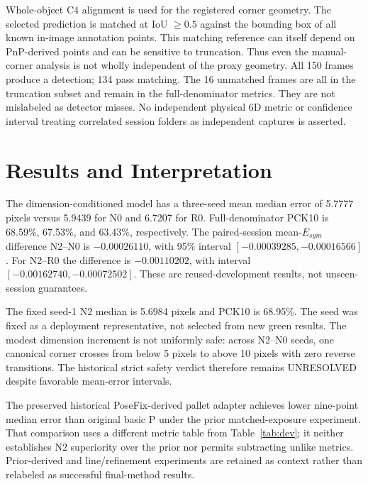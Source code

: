 \documentclass[journal]{IEEEtran}
\begin{document}
Whole-object C4 alignment is used for the registered corner geometry. The selected prediction is matched at IoU $\geq0.5$ against the bounding box of all known in-image annotation points. This matching reference can itself depend on PnP-derived points and can be sensitive to truncation. Thus even the manual-corner analysis is not wholly independent of the proxy geometry. All 150 frames produce a detection; 134 pass matching. The 16 unmatched frames are all in the truncation subset and remain in the full-denominator metrics. They are not mislabeled as detector misses. No independent physical 6D metric or confidence interval treating correlated session folders as independent captures is asserted.

\section{Results and Interpretation}
\begin{table}[t]
\centering
\caption{Historical DEV319 under a single symmetry-aware corner8 contract. Median and P90 are matched pooled pixels; PCK10 uses the complete supervised denominator. The final row is the fixed deployment representative, not the three-seed mean.}

\label{tab:dev}
\end{table}
The dimension-conditioned model has a three-seed mean median error of 5.7777 pixels versus 5.9439 for N0 and 6.7207 for R0. Full-denominator PCK10 is 68.59\%, 67.53\%, and 63.43\%, respectively. The paired-session mean-$E_{sym}$ difference N2--N0 is $-0.00026110$, with 95\% interval $[-0.00039285,-0.00016566]$. For N2--R0 the difference is $-0.00110202$, with interval $[-0.00162740,-0.00072502]$. These are reused-development results, not unseen-session guarantees.

The fixed seed-1 N2 median is 5.6984 pixels and PCK10 is 68.95\%. The seed was fixed as a deployment representative, not selected from new green results. The modest dimension increment is not uniformly safe: across N2--N0 seeds, one canonical corner crosses from below 5 pixels to above 10 pixels with zero reverse transitions. The historical strict safety verdict therefore remains UNRESOLVED despite favorable mean-error intervals.



The preserved historical PoseFix-derived pallet adapter achieves lower nine-point median error than original basic P under the prior matched-exposure experiment. That comparison uses a different metric table from Table~\ref{tab:dev}; it neither establishes N2 superiority over the prior nor permits subtracting unlike metrics. Prior-derived and line/refinement experiments are retained as context rather than relabeled as successful final-method results.
\end{document}
